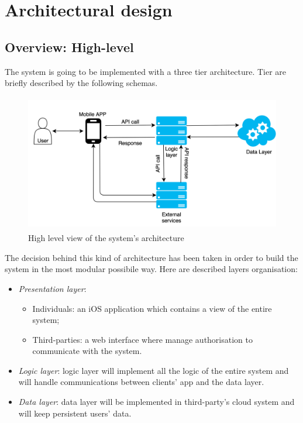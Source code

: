 \documentclass[DD.tex]{subfiles}
\begin{document}
\section{Architectural design}
\subsection{Overview: High-level}

The system is going to be implemented with a three tier architecture. \newline Tier are briefly described by the following schemas.

\begin{figure}[h!]
	\centering
	\includegraphics[height=6.00cm,keepaspectratio]{Figures/GeneralSchema}
	\caption{High level view of the system's architecture}
\end{figure}

The decision behind this kind of architecture has been taken in order to build the system in the most modular possibile way. Here are described layers organisation:

\begin{itemize}
	\item \textit{Presentation layer}:\begin{itemize}
			\item {Individuals}: an iOS application which contains a view of the entire system;
			\item {Third-parties}: a web interface where  manage authorisation to communicate with the system.
			\end{itemize}
	\item \textit{Logic layer}: logic layer will implement all the logic of the entire system and will handle communications between clients' app and the data layer.
	\item \textit{Data layer}: data layer will be implemented in third-party's cloud system and will keep persistent users' data.
\end{itemize}
\end{document}
